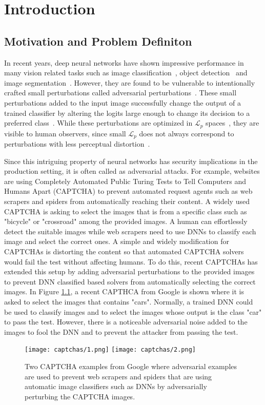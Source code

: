 \chapter{Introduction}
\label{chp:1_introduction}

\section{Motivation and Problem Definiton}
In recent years, deep neural networks have shown impressive performance in many vision related tasks such as image classification~\cite{he2015deep}, object detection~\cite{redmon2018yolov3} and image segmentation~\cite{long2015fully}. However, they are found to be vulnerable to intentionally crafted small perturbations called adversarial perturbations~\cite{szegedy2013intriguing}. These small perturbations added to the input image successfully change the output of a trained classifier by altering the logits large enough to change its decision to a preferred class~\cite{goodfellow2014explaining}. While these perturbations are optimized in \(\mathcal{L}_p\) spaces~\cite{carlini2017towards}, they are visible to human observers, since small \(\mathcal{L}_p\) does not always correspond to perturbations with less perceptual distortion~\cite{jordan2019quantifying,engstrom2018rotation}. 

Since this intriguing property of neural networks has security implications in the production setting, it is often called as adversarial attacks. For example, websites are using Completely Automated Public Turing Tests to Tell Computers and Humans Apart (CAPTCHA) to prevent automated request agents such as web scrapers and spiders from automatically reaching their content. A widely used CAPTCHA is asking to select the images that is from a specific class such as "bicycle" or "crossroad" among the provided images. A human can effortlessly detect the suitable images while web scrapers need to use DNNs to classify each image and select the correct ones. A simple and widely modification for CAPTCHAs is distorting the content so that automated CAPTCHA solvers would fail the test without affecting humans. To do this, recent CAPTCHAs has extended this setup by adding adversarial perturbations to the provided images to prevent DNN classified based solvers from automatically selecting the correct images. In Figure \ref{fig:googlecaptcha}, a recent CAPTHCA from Google is shown where it is asked to select the images that contains "cars". Normally, a trained DNN could be used to classify images and to select the images whose output is the class "car" to pass the test. However, there is a noticeable adversarial noise added to the images to fool the DNN and to prevent the attacker from passing the test.
\begin{figure}[t]
    \centering
    \texttt{[image: captchas/1.png]}
    \texttt{[image: captchas/2.png]}
    \caption{Two CAPTCHA examples from Google where adversarial examples are used to prevent web scrapers and spiders that are using automatic image classifiers such as DNNs by adversarially perturbing the CAPTCHA images.}\label{fig:googlecaptcha}
\end{figure}

